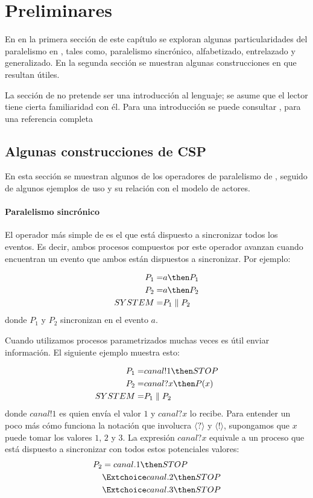 \chapter{Preliminares}

En en la primera sección de este capítulo se exploran algunas particularidades del paralelismo en \CSP, tales como, paralelismo sincrónico, alfabetizado, entrelazado y generalizado. En la segunda sección se muestran algunas construcciones en \CSPm que resultan útiles. 

La sección de \CSP no pretende ser una introducción al lenguaje; se asume que el lector tiene cierta familiaridad con él. Para una introducción se puede consultar \cite{Cristia:CSP}, para una referencia completa \cite{Roscoe:1997:TPC:550448}

\section{Algunas construcciones de CSP}

En esta sección se muestran algunos de los operadores de paralelismo de \CSP, seguido de algunos ejemplos de uso y su relación con el modelo de actores.  

\subsubsection*{Paralelismo sincrónico}

El operador más simple de \CSP es el que está dispuesto a sincronizar todos los eventos. Es decir, ambos procesos compuestos por este operador avanzan cuando encuentran un evento que ambos están dispuestos a sincronizar. Por ejemplo:

\begin{align*}
P_1 =& a \then P_1\\
P_2 =& a \then P_2 \\
SYSTEM =& P_1 \parallel P_2
\end{align*}
donde $P_1$ y $P_2$ sincronizan en el evento $a$. 

Cuando utilizamos procesos parametrizados muchas veces es útil enviar información. El siguiente ejemplo muestra esto:

\begin{align*}
P_1 =& canal!1 \then STOP \\
P_2 =& canal?x \then P(x) \\
SYSTEM =& P_1 \parallel P_2 \\
\end{align*}
donde $canal!1$ es quien envía el valor $1$ y $canal?x$ lo recibe. Para entender un poco más cómo funciona la notación que involucra $\langle ? \rangle$ y $\langle ! \rangle$, supongamos que $x$ puede tomar los valores $1$, $2$ y $3$. La expresión $canal?x$ equivale a un proceso que está dispuesto a sincronizar con todos estos potenciales valores:
\begin{align*}
P_2 & =  canal.1 \then STOP \\
      & \Extchoice canal.2 \then STOP \\
      & \Extchoice canal.3 \then STOP 
\end{align*}

